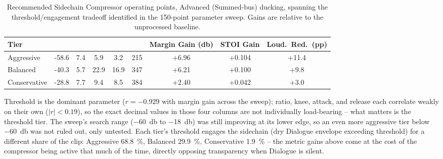 \begin{table}[h]
\centering
\scriptsize
\caption{Recommended Sidechain Compressor operating points, Advanced
(Summed-bus) ducking, spanning the threshold/engagement tradeoff
identified in the 150-point parameter sweep. Gains are relative to the
unprocessed baseline.}
\label{tab:recommended-settings}
\begin{tabular}{@{}l S[table-format=-2.1] S[table-format=1.1] S[table-format=2.1] S[table-format=2.1] S[table-format=3.0] S[table-format=+1.2] S[table-format=+1.3] S[table-format=+2.1]@{}}
\toprule
{}\textbf{Tier} &  &  &  &  &  & \textbf{Margin Gain} (\si{\decibel}) & \textbf{STOI Gain} & \textbf{Loud.\ Red.\ (pp)} \\
\midrule
Aggressive   & -58.6 & 7.4 & 5.9  & 3.2  & 215 & +6.96 & +0.104 & +11.4 \\
Balanced     & -40.3 & 5.7 & 22.9 & 16.9 & 347 & +6.21 & +0.100 & +9.8  \\
Conservative & -28.8 & 7.7 & 9.4  & 8.5  & 384 & +2.40 & +0.042 & +3.0  \\
\bottomrule
\end{tabular}
\par\vspace{4pt}
\raggedright\footnotesize Threshold is the dominant parameter
($r=-0.929$ with margin gain across the sweep); ratio, knee, attack, and
release each correlate weakly on their own ($|r|<0.19$), so the exact
decimal values in those four columns are not individually load-bearing --
what matters is the threshold tier. The sweep's search range
(\SI{-60}{\decibel} to \SI{-18}{\decibel}) was still improving at its
lower edge, so an even more aggressive tier below \SI{-60}{\decibel}
was not ruled out, only untested. Each tier's threshold engages the
sidechain (dry Dialogue envelope exceeding threshold) for a different
share of the clip: Aggressive \SI{68.8}{\percent}, Balanced
\SI{29.9}{\percent}, Conservative \SI{1.9}{\percent} -- the metric gains
above come at the cost of the compressor being active that much of the
time, directly opposing transparency when Dialogue is silent.
\end{table}
